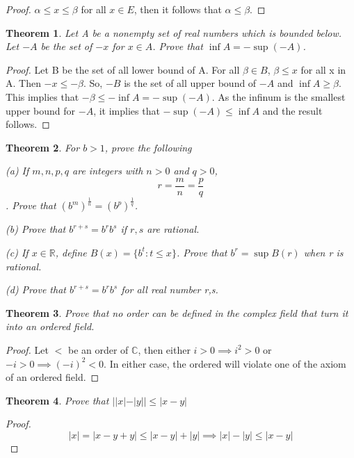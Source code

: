 \documentclass{article}
\theoremstyle{plain}
\newtheorem{theorem}{Theorem}
\theoremstyle{definition}
\begin{document}
\begin{proof}
	$\alpha \leq x \leq \beta$ for all $x \in E$, then it follows that $\alpha \leq \beta$.
\end{proof}

\begin{theorem}
	Let A be a nonempty set of real numbers which is bounded below. Let $-A$ be the set of $-x$ for $x \in A$. Prove that $\inf A = -\sup(-A)$.
\end{theorem}

\begin{proof}
	Let B be the set of all lower bound of A. For all $\beta \in B$, $\beta \leq x$ for all x in A. Then $-x \leq -\beta$. So, $-B$ is the set of all upper bound of $-A$ and $\inf A \geq \beta$. This implies that $-\beta \leq - \inf A = - \sup(-A)$. As the infinum is the smallest upper bound for $-A$, it implies that $- \sup(-A) \leq \inf A$ and the result follows.
\end{proof}

\begin{theorem}
	For $b > 1$, prove the following

	(a) If $m,n,p,q$ are integers with $n >0$ and $q > 0$, $$r = \frac{m}{n} = \frac{p}{q} $$. Prove that $(b^{m})^{\frac{1}{n}} = (b^{p})^{\frac{1}{q}}$.

	(b) Prove that $b^{r + s} = b^{r}b^{s}$ if $r,s$ are rational.

	(c) If $x \in \mathbb{R}$, define $B(x) = \{ b^{t}: t \leq x \}$. Prove that $b^{r} = \sup B(r)$ when r is rational.

	(d) Prove that $b^{r + s} = b^{r}b^{s}$ for all real number r,s.
\end{theorem}

\begin{theorem}
	Prove that no order can be defined in the complex field that turn it into an ordered field.
\end{theorem}
\begin{proof}
	Let $<$ be an order of $\mathbb{C}$, then either $i > 0 \implies i^{2} > 0$ or $-i > 0 \implies (-i)^{2} < 0$. In either case, the ordered will violate one of the axiom of an ordered field. 
\end{proof}

\begin{theorem}
	Prove that $||x| - |y|| \leq |x - y|$
\end{theorem}

\begin{proof}
	$$|x| = |x - y + y| \leq |x - y| + |y| \implies |x| - |y| \leq |x - y| $$
\end{proof}
\end{document}
